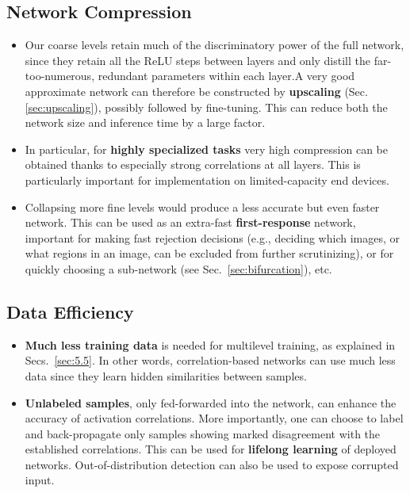\documentclass{article} %
\begin{document}
\subsection{Network Compression}
\label{sec:network_compression}
\begin{itemize}
\item Our coarse levels retain much of the discriminatory power of the full network, since they retain all the ReLU steps between layers and only distill the far-too-numerous, redundant parameters within each layer.A very good approximate network can therefore be constructed by \textbf{upscaling} (Sec.\ref{sec:upscaling}), possibly followed by fine-tuning. This can reduce both the network size and inference time by a large factor.
\item In particular, for \textbf{highly specialized tasks} very high compression can be obtained thanks to especially strong correlations at all layers. This is particularly important for implementation on limited-capacity end devices.
\item Collapsing more fine levels would produce a less accurate but even faster network. This can be used as an extra-fast \textbf{first-response} network, important for making fast rejection decisions (e.g., deciding which images, or what regions in an image, can be excluded from further scrutinizing), or for quickly choosing a sub-network (see Sec.~\ref{sec:bifurcation}), etc.
\end{itemize}

\subsection{Data Efficiency}
\label{sec:effective_data}
\begin{itemize}
	\item \textbf{Much less training data} is needed for multilevel training, as explained in Secs.~\ref{sec:5.5}. In other words, correlation-based networks can use much less data since they learn hidden similarities between samples.
	\item \textbf{Unlabeled samples}, only fed-forwarded into the network, can enhance the accuracy of activation correlations. More importantly, one can choose to label and back-propagate only samples showing marked disagreement with the established correlations. This can be used for \textbf{lifelong learning} of deployed networks. Out-of-distribution detection can also be used to expose corrupted input.
\end{itemize}
\end{document}
